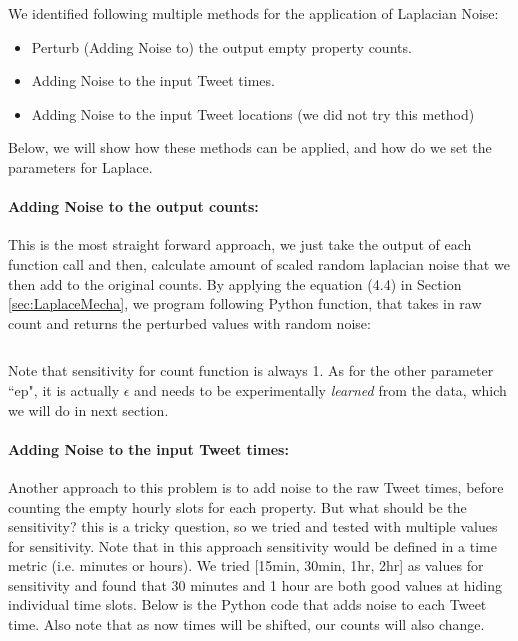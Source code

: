\documentclass[12pt]{report}
\theoremstyle{named}
\begin{document}
We identified following multiple methods for the application of Laplacian Noise:
\begin{itemize}
  \item Perturb (Adding Noise to) the output empty property counts.
  \item Adding Noise to the input Tweet times.
  \item Adding Noise to the input Tweet locations (we did not try this method)
\end{itemize}

Below, we will show how these methods can be applied, and how do we set the parameters for Laplace.

\paragraph{Adding Noise to the output counts:\\}
This is the most straight forward approach, we just take the output of each function call and then, calculate amount of scaled random laplacian noise that we then add to the original counts.
By applying the equation (4.4) in Section \ref{sec:LaplaceMecha}, we program following Python function, that takes in raw count and returns the perturbed values with random noise:

\inputminted{python}{AddLaplaceCount.py}

Note that sensitivity for count function is always 1. As for the other parameter ``ep", it is actually $\epsilon$ and needs to be experimentally \textit{learned} from the data, which we will do in next section.


\paragraph{Adding Noise to the input Tweet times:\\}
Another approach to this problem is to add noise to the raw Tweet times, before counting the empty hourly slots for each property. But what should be the sensitivity? this is a tricky question, so we tried and tested with multiple values for sensitivity. Note that in this approach sensitivity would be defined in a time metric (i.e. minutes or hours). We tried [15min, 30min, 1hr, 2hr] as values for sensitivity and found that 30 minutes and 1 hour are both good values at hiding individual time slots. Below is the Python code that adds noise to each Tweet time. Also note that as now times will be shifted, our counts will also change.
\inputminted{python}{AddLapNoiseTime.py}
\end{document}
